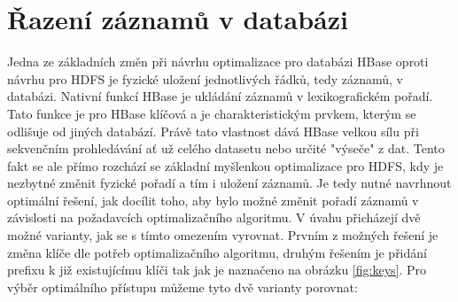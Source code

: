 \documentclass[thesis=M,czech]{FITthesis}[2012/06/26]
\begin{document}
\section{Řazení záznamů v databázi}
Jedna ze základních změn při návrhu optimalizace pro databázi HBase oproti návrhu pro HDFS je fyzické uložení jednotlivých řádků, tedy záznamů, v databázi. Nativní funkcí HBase je ukládání záznamů v lexikografickém pořadí. Tato funkce je pro HBase klíčová a je charakteristickým prvkem, kterým se odlišuje od jiných databází. Právě tato vlastnost dává HBase velkou sílu při sekvenčním prohledávání ať už celého datasetu nebo určité "výseče" z dat. Tento fakt se ale přímo rozchází se základní myšlenkou optimalizace pro HDFS, kdy je nezbytné změnit fyzické pořadí a tím i uložení záznamů. 
Je tedy nutné navrhnout optimální řešení, jak docílit toho, aby bylo možné změnit pořadí záznamů v závislosti na požadavcích optimalizačního algoritmu. V úvahu přicházejí dvě možné varianty, jak se s tímto omezením vyrovnat. Prvním z možných řešení je změna klíče dle potřeb optimalizačního algoritmu, druhým řešením je přidání prefixu k již existujícímu klíči tak jak je naznačeno na obrázku \ref{fig:keys}. Pro výběr optimálního přístupu můžeme tyto dvě varianty porovnat:
\end{document}
